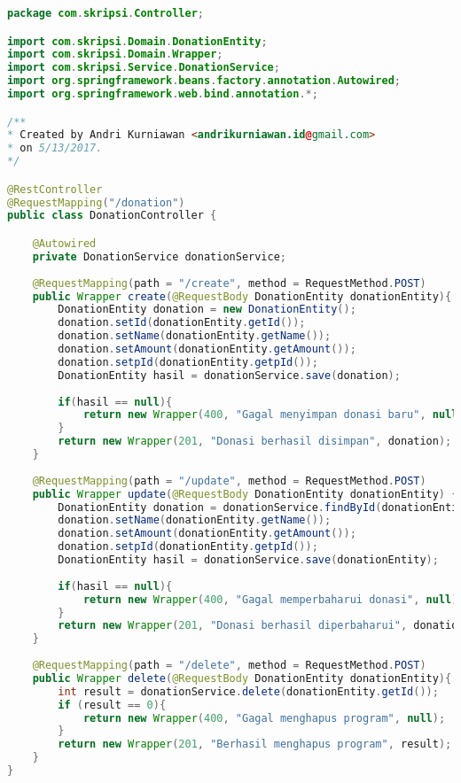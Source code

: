 \begin{lstlisting}[caption={Berkas DonationController.java},label={lst:DonationController},language=Java]
package com.skripsi.Controller;

import com.skripsi.Domain.DonationEntity;
import com.skripsi.Domain.Wrapper;
import com.skripsi.Service.DonationService;
import org.springframework.beans.factory.annotation.Autowired;
import org.springframework.web.bind.annotation.*;

/**
* Created by Andri Kurniawan <andrikurniawan.id@gmail.com>
* on 5/13/2017.
*/

@RestController
@RequestMapping("/donation")
public class DonationController {

	@Autowired
	private DonationService donationService;
	
	@RequestMapping(path = "/create", method = RequestMethod.POST)
	public Wrapper create(@RequestBody DonationEntity donationEntity){
		DonationEntity donation = new DonationEntity();
		donation.setId(donationEntity.getId());
		donation.setName(donationEntity.getName());
		donation.setAmount(donationEntity.getAmount());
		donation.setpId(donationEntity.getpId());
		DonationEntity hasil = donationService.save(donation);
		
		if(hasil == null){
			return new Wrapper(400, "Gagal menyimpan donasi baru", null);
		}
		return new Wrapper(201, "Donasi berhasil disimpan", donation);
	}
	
	@RequestMapping(path = "/update", method = RequestMethod.POST)
	public Wrapper update(@RequestBody DonationEntity donationEntity) {
		DonationEntity donation = donationService.findById(donationEntity.getId());
		donation.setName(donationEntity.getName());
		donation.setAmount(donationEntity.getAmount());
		donation.setpId(donationEntity.getpId());
		DonationEntity hasil = donationService.save(donationEntity);
		
		if(hasil == null){
			return new Wrapper(400, "Gagal memperbaharui donasi", null);
		}
		return new Wrapper(201, "Donasi berhasil diperbaharui", donation);
	}
	
	@RequestMapping(path = "/delete", method = RequestMethod.POST)
	public Wrapper delete(@RequestBody DonationEntity donationEntity){
		int result = donationService.delete(donationEntity.getId());
		if (result == 0){
			return new Wrapper(400, "Gagal menghapus program", null);
		}
		return new Wrapper(201, "Berhasil menghapus program", result);
	}
}


\end{lstlisting}

